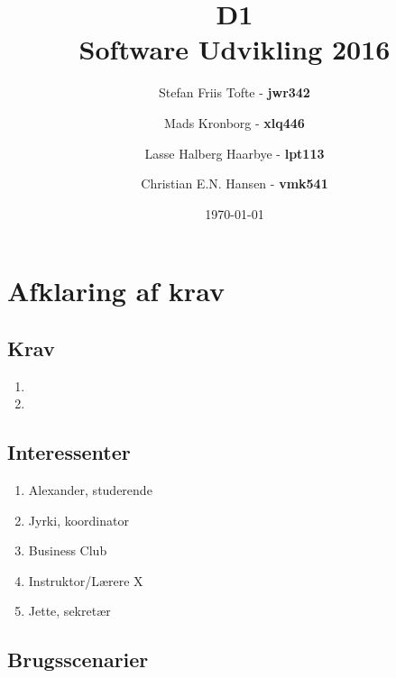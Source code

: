 \documentclass[11pt]{article}
\title{
  \vspace{3cm}
  \Huge{D1} \\
  \Large{Software Udvikling 2016}
}
\author{
	\Large{Stefan Friis Tofte} - \textbf{jwr342}%
	\and
	\Large{Mads Kronborg} - \textbf{xlq446}%
	\and
	\Large{Lasse Halberg Haarbye} - \textbf{lpt113}%
	\and
	\Large{Christian E.N. Hansen} - \textbf{vmk541}%
}
\date{
    \today
}
\def \ColourPDF {../include/ku-farve}
\def \TitlePDF {../include/ku-en}  %
\begin{document}


\clearpage\maketitle
\thispagestyle{empty}

\newpage
\tableofcontents
\newpage
\section{Afklaring af krav}
\subsection{Krav}
\begin{enumerate}
\item
\item
\end{enumerate}
\subsection{Interessenter}
\begin{enumerate}
\item Alexander, studerende
\item Jyrki, koordinator
\item Business Club
\item Instruktor/Lærere X
\item Jette, sekretær
\end{enumerate}
\subsection{Brugsscenarier}
\end{document}
